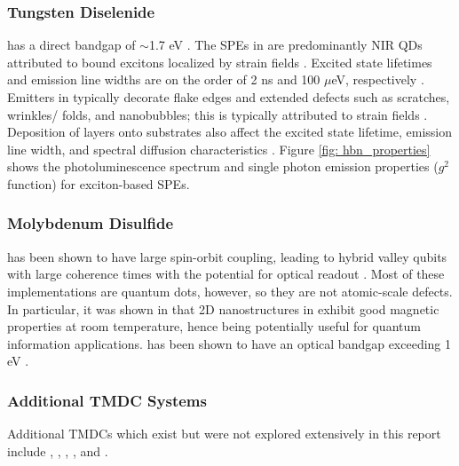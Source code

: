 \documentclass[]{article}
\begin{document}
\subsubsection{Tungsten Diselenide}
 has a direct bandgap of $\sim$1.7 eV \cite{SP_sources_atomically_thin_materials_review}. The SPEs in  are predominantly NIR QDs attributed to bound excitons localized by strain fields \cite{SP_sources_atomically_thin_materials_review, WSe2_QE_hBN, SPE_silicon_nitride_photonic_chip}. Excited state lifetimes and emission line widths are on the order
of 2 ns and 100 $\mu$eV, respectively \cite{SP_sources_atomically_thin_materials_review, Single_quantum_emitters_monolayer_semiconductors_WSe2_MoS2}. Emitters in  typically decorate flake edges and extended defects such as scratches, wrinkles/
folds, and nanobubbles; this is typically attributed to strain fields \cite{SP_sources_atomically_thin_materials_review}. Deposition of  layers onto substrates also affect the excited state lifetime, emission line width, and spectral diffusion characteristics \cite{SP_sources_atomically_thin_materials_review, SPE_silicon_nitride_photonic_chip, WSe2_QE_hBN}. Figure \ref{fig: hbn_properties} shows the photoluminescence spectrum and single photon emission properties ($g^2$ function) for exciton-based SPEs.

\subsubsection{Molybdenum Disulfide}
 has been shown to have large spin-orbit coupling, leading to hybrid valley qubits with large coherence times with the potential for optical readout \cite{2D_materials_for_quantum_information_science, SP_sources_atomically_thin_materials_review}. Most of these implementations are quantum dots, however, so they are not atomic-scale defects. In particular, it was shown in \cite{MOS2_properties} that 2D nanostructures in  exhibit good magnetic properties at room temperature, hence being potentially useful for quantum information applications.  has been shown to have an optical bandgap exceeding 1 eV \cite{2D_material_nanophotonics_HBN_BANDGAP}.

\subsubsection{Additional TMDC Systems}

Additional TMDCs which exist but were not explored extensively in this report include  \cite{SPE_GaSe},  \cite{WS2_electrically_driven_photon_emission},  \cite{WTe2_point_defects_influence},  \cite{SP_sources_atomically_thin_materials_review, 2D_material_nanophotonics_HBN_BANDGAP}, and  \cite{SP_sources_atomically_thin_materials_review}.
\end{document}
